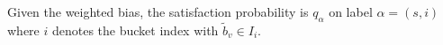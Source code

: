 Given the weighted bias, the satisfaction probability is  $q_{\alpha}$ on  label    $\alpha = (s,i)$ where  $i$ denotes the bucket index with $\widetilde b_v\in I_{i}$.

































